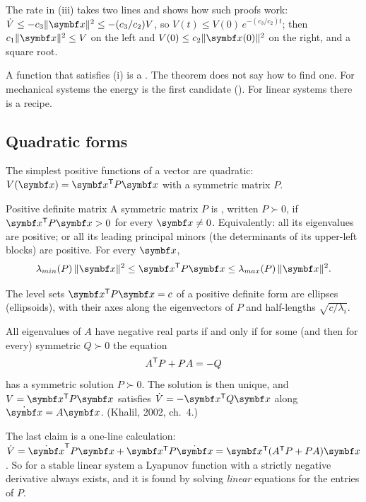 The rate in (iii) takes two lines and shows how such proofs work: $\dot V \le -c_3\|\vx\|^2 \le -(c_3/c_2)V$, so $V(t) \le V(0)\,e^{-(c_3/c_2)t}$; then $c_1\|\vx\|^2 \le V$ on the left and $V(0) \le c_2\|\vx(0)\|^2$ on the right, and a square root.

A function that satisfies (i) is a . The theorem does not say how to find one. For mechanical systems the energy is the first candidate (). For linear systems there is a recipe.

\subsection{Quadratic forms}
The simplest positive functions of a vector are quadratic: $V(\vx) = \vx^\T P\vx$ with a symmetric matrix $P$.

\begin{definition}{Positive definite matrix}
A symmetric matrix $P$ is , written $P \succ 0$, if $\vx^\T P\vx > 0$ for every $\vx \ne 0$. Equivalently: all its eigenvalues are positive; or all its leading principal minors (the determinants of its upper-left blocks) are positive. For every $\vx$,
\begin{equation}\label{eq:G-rayleigh}
  \lambda_{min}(P)\,\|\vx\|^2 \le \vx^\T P\vx \le \lambda_{max}(P)\,\|\vx\|^2 .
\end{equation}
\end{definition}

The level sets $\vx^\T P\vx = c$ of a positive definite form are ellipses (ellipsoids), with their axes along the eigenvectors of $P$ and half-lengths $\sqrt{c/\lambda_i}$.

\begin{theorem}
\label{thm:G-lyapeq}
All eigenvalues of $A$ have negative real parts if and only if for some (and then for every) symmetric $Q \succ 0$ the equation
\begin{equation}\label{eq:G-lyapeq}
  A^{\mathsf{T}} P + P A = -Q
\end{equation}
has a symmetric solution $P \succ 0$. The solution is then unique, and $V = \vx^\T P\vx$ satisfies $\dot V = -\vx^\T Q\vx$ along $\dot{\vx} = A\vx$. (Khalil, 2002, ch.~4.)
\end{theorem}

The last claim is a one-line calculation: $\dot V = \dot{\vx}^\T P\vx + \vx^\T P\dot{\vx} = \vx^\T(A^\T P + PA)\vx$. So for a stable linear system a Lyapunov function with a strictly negative derivative always exists, and it is found by solving \emph{linear} equations for the entries of $P$.

